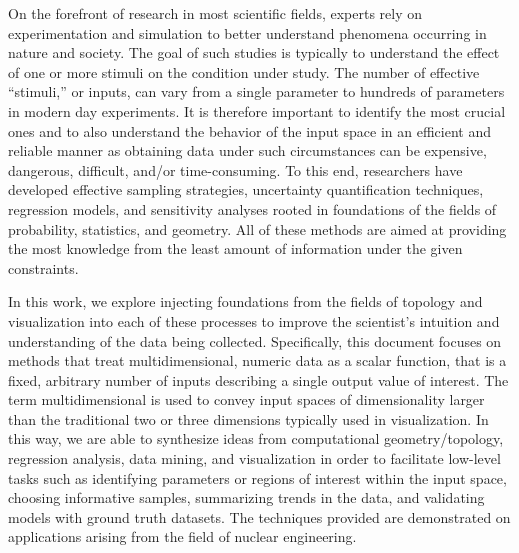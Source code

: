 
On the forefront of research in most scientific fields, experts rely on experimentation and simulation to better understand phenomena occurring in nature and society.
%
The goal of such studies is typically to understand the effect of one or more stimuli on the condition under study.
%
The number of effective ``stimuli,'' or inputs, can vary from a single parameter to hundreds of parameters in modern day experiments.
%
It is therefore important to identify the most crucial ones and to also understand the behavior of the input space in an efficient and reliable manner as obtaining data under such circumstances can be expensive, dangerous, difficult, and/or time-consuming.
%
To this end, researchers have developed effective sampling strategies, uncertainty quantification techniques, regression models, and sensitivity analyses rooted in foundations of the fields of probability, statistics, and geometry.
%
All of these methods are aimed at providing the most knowledge from the least amount of information under the given constraints.

In this work, we explore injecting foundations from the fields of topology and visualization into each of these processes to improve the scientist's intuition and understanding of the data being collected.
%
Specifically, this document focuses on methods that treat multidimensional, numeric data as a scalar function, that is a fixed, arbitrary number of inputs describing a single output value of interest.
%
The term multidimensional is used to convey input spaces of dimensionality larger than the traditional two or three dimensions typically used in visualization.
%
In this way, we are able to synthesize ideas from computational geometry/topology, regression analysis, data mining, and visualization in order to facilitate low-level tasks such as identifying parameters or regions of interest within the input space, choosing informative samples, summarizing trends in the data, and validating models with ground truth datasets.
%
The techniques provided are demonstrated on applications arising from the field of nuclear engineering.

